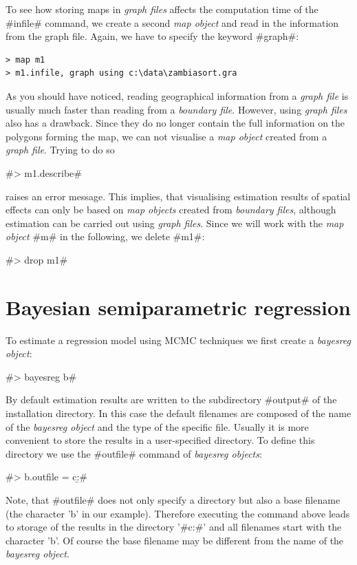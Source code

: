 \documentclass{article}
\begin{document}
To see how storing maps in {\it graph files} affects the
computation time of the #infile# command, we create a second {\it
map object} and read in the information from the graph file.
Again, we have to specify the keyword #graph#:

\begin{verbatim}
> map m1
> m1.infile, graph using c:\data\zambiasort.gra
\end{verbatim}

As you should have noticed, reading geographical information from
a {\it graph file} is usually much faster than reading from a {\it
boundary file}. However, using {\it graph files} also has a
drawback. Since they do no longer contain the full information on
the polygons forming the map, we can not visualise a {\it map
object} created from a {\it graph file}. Trying to do so

#> m1.describe#

raises an error message. This implies, that visualising estimation
results of spatial effects can only be based on {\it map objects}
created from {\it boundary files}, although estimation can be
carried out using {\it graph files}. Since we will work with the
{\it map object} #m# in the following, we delete #m1#:

#> drop m1#

\section{Bayesian semiparametric regression}\label{regression}

To estimate a regression model using MCMC techniques we first
create a {\it bayesreg object}:

#> bayesreg b#

By default estimation results are written to the subdirectory
#output# of the installation directory. In this case the default
filenames are composed of the name of the {\it bayesreg object}
and the type of the specific file. Usually it is more convenient
to store the results in a user-specified directory. To define this
directory we use the #outfile# command of {\it bayesreg objects}:

#> b.outfile = c:\data\b#

Note, that #outfile# does not only specify a directory but also a
base filename (the character 'b' in our example). Therefore
executing the command above leads to storage of the results in the
directory '#c:\data#' and all filenames start with the character
'b'. Of course the base filename may be different from the name of
the {\it bayesreg object}.
\end{document}
